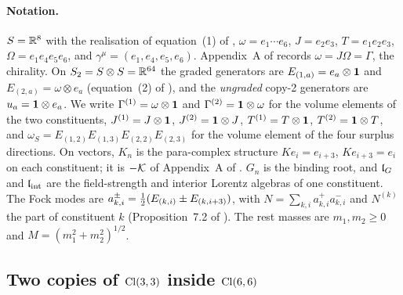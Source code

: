 \paragraph{Notation.} $S=\mathbb{R}^8$ with the realisation of equation~(1) of \cite{ES17}, $\omega=e_1\cdots e_6$, $J=e_2e_3$, $T=e_1e_2e_3$,
$\Omega=e_1e_4e_5e_6$, and $\gamma^\mu=(e_1,e_4,e_5,e_6)$. Appendix~A of \cite{ES17} records $\omega=J\Omega=\Gamma$, the chirality. On
$S_2=S\otimes S=\mathbb{R}^{64}$ the graded generators are $E_{(1,a)}=e_a\otimes\mathbf 1$ and $E_{(2,a)}=\omega\otimes e_a$ (equation~(2) of \cite{ES17}),
and the \emph{ungraded} copy-2 generators are $u_a=\mathbf 1\otimes e_a$. We write $\Gamma^{(1)}=\omega\otimes\mathbf 1$ and $\Gamma^{(2)}=\mathbf 1\otimes\omega$
for the volume elements of the two constituents, $J^{(1)}=J\otimes\mathbf 1$, $J^{(2)}=\mathbf 1\otimes J$, $T^{(1)}=T\otimes\mathbf 1$, $T^{(2)}=\mathbf 1\otimes T$,
and $\omega_S=E_{(1,2)}E_{(1,3)}E_{(2,2)}E_{(2,3)}$ for the volume element of the four surplus directions. On vectors, $K_n$ is the
para-complex structure $Ke_i=e_{i+3}$, $Ke_{i+3}=e_i$ on each constituent; it is $-\mathcal K$ of Appendix~A of \cite{ES17}. $G_n$ is the binding
root, and $\mathfrak l_G$ and $\mathfrak l_{\rm int}$ are the field-strength and interior Lorentz algebras of one constituent. The Fock modes are
$a^\pm_{k,i}=\tfrac12(E_{(k,i)}\pm E_{(k,i+3)})$, with $N=\sum_{k,i}a^+_{k,i}a^-_{k,i}$ and $N^{(k)}$ the part of constituent $k$
(Proposition~7.2 of \cite{RE}). The rest masses are $m_1,m_2\ge0$ and $M=(m_1^2+m_2^2)^{1/2}$.

\subsection{Two copies of \texorpdfstring{$\mathrm{Cl}(3,3)$}{Cl(3,3)} inside \texorpdfstring{$\mathrm{Cl}(6,6)$}{Cl(6,6)}}
\label{e1:sec:copies}

